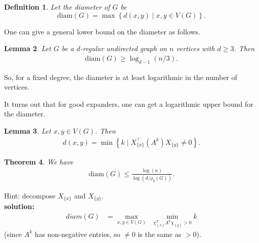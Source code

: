 \documentclass[12pt]{article}%
\newtheorem{theorem}{Theorem}
\newtheorem{definition}[theorem]{Definition}
\newtheorem{lemma}[theorem]{Lemma}
\begin{document}
\begin{definition}
Let the \emph{diameter} of $G$ be 
\begin{equation*}
\mathrm{diam}(G)=\max \left\{ d(x,y)\mid x,y\in V(G)\right\} .
\end{equation*}
\end{definition}

One can give a general lower bound on the diameter as follows.

\begin{lemma}
Let $G$ be a $d$-regular undirected graph on $n$ vertices with $d\geq 3$.
Then 
\begin{align}
\mathrm{diam}(G)\geq \log _{d-1}(n/3).
\end{align}
\end{lemma}

So, for a fixed degree, the diameter is at least logarithmic in the number
of vertices.

It turns out that for good expanders, one can get a logarithmic upper bound
for the diameter. 

\begin{lemma}
Let $x,y\in V(G)$. Then 
\begin{align}
d(x,y)=\min \left\{ k\mid X_{\{x\}}^{\top }(A^{k})X_{\{y\}}\neq 0\right\} .
\end{align}

\end{lemma}

\begin{theorem}
We have 
\begin{align}
\mathrm{diam}(G)\leq \frac{\log (n)}{\log (d/\rho _{0}(G))}\text{.}
\end{align}

\end{theorem}

Hint: decompose $X_{\{x\}}$ and $X_{\{y\}}$.\\
\textbf{solution:}\\

  \begin{align}
      diam (G) &= \max_{x,y \in V(G)} \ \ \min_{\chi^T_{\left\{ x \right\}} A^k \chi_{\left\{ y \right\}} > 0 } k
  \end{align}
  (since $A^k$ has non-negative entries, so $\neq 0$ 
  is the same as $>0$).
\end{document}

